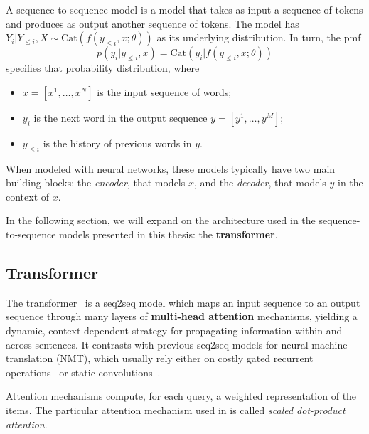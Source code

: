 \begin{definition}
    A sequence-to-sequence model is a model that takes as input a
    sequence of tokens and produces as output another sequence of tokens.
    The model has $Y_i | Y_{\leq i}, X \sim \text{Cat}(f(y_{\leq i}, x;
        \theta))$ as its underlying distribution. In turn, the pmf
    \begin{equation}
        p(y_i|y_{\leq i}, x) = \text{Cat}(y_i|f(y_{\leq i}, x; \theta))
    \end{equation}
    specifies that probability distribution, where
    \begin{itemize}
        \item $x=[x^1, \dots, x^N]$ is the input sequence of words;
        \item $y_i$ is the next word in the output sequence $y=[y^1, \dots, y^M]$;
        \item $y_{\leq i}$ is the history of previous words in $y$.
    \end{itemize}
    When modeled with neural networks, these models typically have
    two main building blocks: the \textit{encoder}, that models $x$,
    and the \textit{decoder}, that models $y$ in the context of $x$.
\end{definition}

In the following section, we will expand on the architecture used in
the sequence-to-sequence models presented in this thesis: the \textbf{transformer}.

\subsection{Transformer}
\label{sec:transformer_bg}

\noindent The transformer~\citep{vaswani2017attention} is a seq2seq model which
maps an input sequence to an output sequence through many layers of
\textbf{multi-head attention} mechanisms, yielding a dynamic,
context-dependent strategy for propagating information within and
across sentences. It contrasts with previous seq2seq models for neural machine translation (NMT), which
usually rely either on costly gated recurrent operations~\citep[often
    LSTMs:][]{bahdanau2014neural,luong2015effective} or static
convolutions~\citep{convseq}.

Attention mechanisms compute, for each query, a weighted
representation of the items. The particular attention mechanism used
in \citet{vaswani2017attention} is called \emph{scaled dot-product
    attention}.

